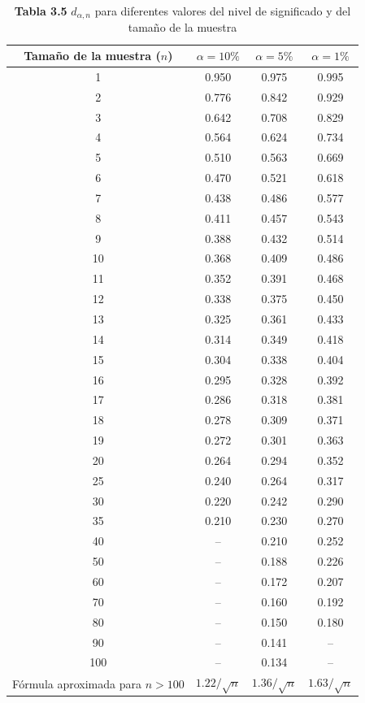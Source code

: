 \documentclass[11pt,letterpaper]{report}
\begin{document}
\begin{table}[H]
\centering
\caption*{\textbf{Tabla 3.5} $d_{\alpha,n}$ para diferentes valores del nivel de significado y del tamaño de la muestra}
\begin{tabular}{cccc}
\toprule
Tamaño de la muestra ($n$) & $\alpha=10\%$ & $\alpha=5\%$ & $\alpha=1\%$ \\
\midrule
1 & 0.950 & 0.975 & 0.995 \\
2 & 0.776 & 0.842 & 0.929 \\
3 & 0.642 & 0.708 & 0.829 \\
4 & 0.564 & 0.624 & 0.734 \\
5 & 0.510 & 0.563 & 0.669 \\
6 & 0.470 & 0.521 & 0.618 \\
7 & 0.438 & 0.486 & 0.577 \\
8 & 0.411 & 0.457 & 0.543 \\
9 & 0.388 & 0.432 & 0.514 \\
10 & 0.368 & 0.409 & 0.486 \\
11 & 0.352 & 0.391 & 0.468 \\
12 & 0.338 & 0.375 & 0.450 \\
13 & 0.325 & 0.361 & 0.433 \\
14 & 0.314 & 0.349 & 0.418 \\
15 & 0.304 & 0.338 & 0.404 \\
16 & 0.295 & 0.328 & 0.392 \\
17 & 0.286 & 0.318 & 0.381 \\
18 & 0.278 & 0.309 & 0.371 \\
19 & 0.272 & 0.301 & 0.363 \\
20 & 0.264 & 0.294 & 0.352 \\
25 & 0.240 & 0.264 & 0.317 \\
30 & 0.220 & 0.242 & 0.290 \\
35 & 0.210 & 0.230 & 0.270 \\
40 & -- & 0.210 & 0.252 \\
50 & -- & 0.188 & 0.226 \\
60 & -- & 0.172 & 0.207 \\
70 & -- & 0.160 & 0.192 \\
80 & -- & 0.150 & 0.180 \\
90 & -- & 0.141 & -- \\
100 & -- & 0.134 & -- \\
\midrule
Fórmula aproximada para $n>100$ & $1.22/\sqrt{n}$ & $1.36/\sqrt{n}$ & $1.63/\sqrt{n}$ \\
\bottomrule
\end{tabular}
\end{table}
\end{document}

